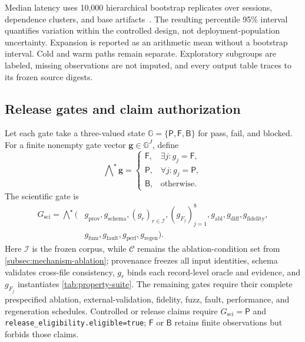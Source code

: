 Median latency uses 10,000 hierarchical bootstrap replicates over sessions,
dependence clusters, and base artifacts~\cite{efron1979}. The resulting
percentile 95\% interval quantifies variation within the controlled design, not
deployment-population uncertainty. Expansion is reported as an arithmetic mean
without a bootstrap interval. Cold and warm paths remain separate. Exploratory
subgroups are labeled, missing observations are not imputed, and every output
table traces to its frozen source digests.

\subsection{Release gates and claim authorization}
\label{subsec:release-gates}

Let each gate take a three-valued state
\(\mathbb G=\{\mathsf P,\mathsf F,\mathsf B\}\) for pass, fail, and blocked.
For a finite nonempty gate vector \(\mathbf g\in\mathbb G^J\), define
\begin{equation}
 \bigwedge\nolimits^\star\mathbf g=
 \begin{cases}
  \mathsf F,&\exists j:g_j=\mathsf F,\\
  \mathsf P,&\forall j:g_j=\mathsf P,\\
  \mathsf B,&\text{otherwise}.
 \end{cases}
 \label{eq:three-valued-gate}
\end{equation}
The scientific gate is
\begin{equation}
\begin{aligned}
 G_{\mathrm{sci}}=\bigwedge\nolimits^\star\bigl(&
 g_{\mathrm{prov}},g_{\mathrm{schema}},
 (g_r)_{r\in\mathcal I},(g_{F_j})_{j=1}^{8},
 g_{\mathrm{abl}},g_{\mathrm{diff}},g_{\mathrm{fidelity}},\\
 &g_{\mathrm{fuzz}},g_{\mathrm{fault}},g_{\mathrm{perf}},
 g_{\mathrm{regen}}\bigr).
\end{aligned}
 \label{eq:scientific-gate}
\end{equation}
Here \(\mathcal I\) is the frozen corpus, while \(\mathcal C\) remains the
ablation-condition set from \cref{subsec:mechanism-ablation}; provenance freezes
all input identities, schema validates cross-file consistency, \(g_r\) binds
each record-level oracle and evidence, and \(g_{F_j}\) instantiates
\cref{tab:property-suite}. The remaining gates require their complete
prespecified ablation, external-validation, fidelity, fuzz, fault, performance,
and regeneration schedules. Controlled or release claims require
\(G_{\mathrm{sci}}=\mathsf P\) and
\texttt{release\_eligibility.eligible=true}; \(\mathsf F\) or \(\mathsf B\)
retains finite observations but forbids those claims.
